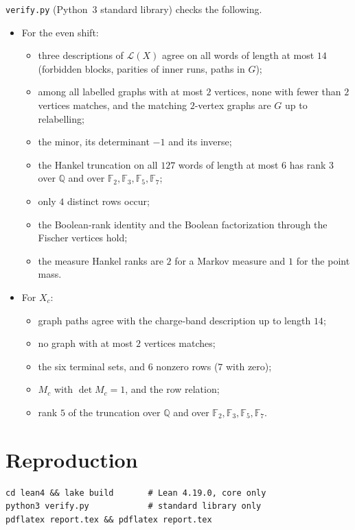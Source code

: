 \documentclass[11pt]{article}
\theoremstyle{definition}
\theoremstyle{remark}
\newcommand{\Lang}{\mathcal{L}}
\begin{document}
\texttt{verify.py} (Python~3 standard library) checks the following.
\begin{itemize}
\item For the even shift:
  \begin{itemize}
  \item three descriptions of $\Lang(X)$ agree on all words of length at most $14$
  (forbidden blocks, parities of inner runs, paths in $G$);
  \item among all labelled graphs with at most $2$ vertices, none with fewer than
  $2$ vertices matches, and the matching $2$-vertex graphs are $G$ up to relabelling;
  \item the minor, its determinant $-1$ and its inverse;
  \item the Hankel truncation on all $127$ words of length at most $6$ has rank
  $3$ over $\mathbb Q$ and over $\mathbb F_2,\mathbb F_3,\mathbb F_5,\mathbb F_7$;
  \item only $4$ distinct rows occur;
  \item the Boolean-rank identity and the Boolean factorization through the
  Fischer vertices hold;
  \item the measure Hankel ranks are $2$ for a Markov measure and $1$ for the point mass.
  \end{itemize}
\item For $X_c$:
  \begin{itemize}
  \item graph paths agree with the charge-band description up to length $14$;
  \item no graph with at most $2$ vertices matches;
  \item the six terminal sets, and $6$ nonzero rows ($7$ with zero);
  \item $M_c$ with $\det M_c=1$, and the row relation;
  \item rank $5$ of the truncation over $\mathbb Q$ and over $\mathbb F_2,\mathbb F_3,\mathbb F_5,\mathbb F_7$.
  \end{itemize}
\end{itemize}

\section{Reproduction}
\begin{verbatim}
cd lean4 && lake build       # Lean 4.19.0, core only
python3 verify.py            # standard library only
pdflatex report.tex && pdflatex report.tex
\end{verbatim}
\end{document}
